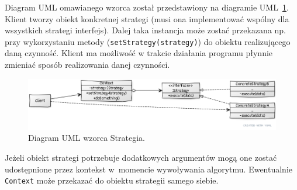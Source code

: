 
Diagram UML omawianego wzorca został przedstawiony na diagramie UML~\ref{lab4/fig/StrategyUml}. Klient tworzy obiekt konkretnej strategi (musi ona implementować wspólny dla wszystkich strategi interfejs). Dalej taka instancja może zostać przekazana np. przy wykorzystaniu metody (\texttt{setStrategy(strategy)}) do obiektu realizującego daną czynność. Klient ma możliwość w trakcie działania programu płynnie zmieniać sposób realizowania danej czynności.

\begin{figure}[hbt!]
	\centering
	\includegraphics[width=0.9\linewidth]{images/StrategyUml}
	\caption{Diagram UML wzorca Strategia.}
	\label{lab4/fig/StrategyUml}
\end{figure}
%


Jeżeli obiekt strategi potrzebuje dodatkowych argumentów mogą one zostać udostępnione przez kontekst w~momencie wywoływania algorytmu. Ewentualnie \texttt{Context} może przekazać do obiektu strategii samego siebie.

